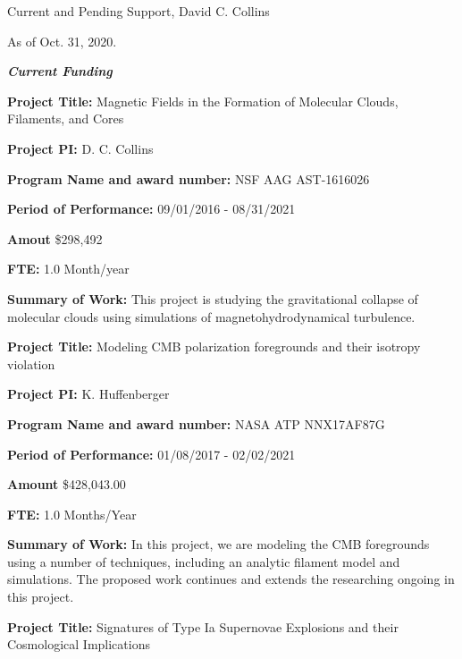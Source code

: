 \documentclass[10pt]{article}
\begin{document}
\newcommand{\LT}[1]{\noindent\textbf{#1}}
\begin{LARGE}
\noindent Current and Pending Support, David C. Collins
\end{LARGE}

As of Oct. 31, 2020.



\vspace{0.1in}

\noindent \large{\textbf{\emph{Current Funding}}}

\vspace{0.1in}

\LT{Project Title:} Magnetic Fields in the Formation of Molecular Clouds,
Filaments, and Cores

\LT{Project PI:} D. C. Collins

\LT{Program Name and award number:} NSF AAG  AST-1616026 

\LT{Period of Performance:} 09/01/2016 - 08/31/2021

\LT{Amout} \$298,492 

\LT{FTE:} 1.0 Month/year

\LT{Summary of Work:} This project is studying the gravitational collapse of
molecular clouds using simulations of magnetohydrodynamical turbulence.  

\vspace{0.1in}


\LT{Project Title:} Modeling CMB polarization foregrounds and their isotropy
violation

\LT{Project PI:} K. Huffenberger 

\LT{Program Name and award number:} NASA ATP  NNX17AF87G

\LT{Period of Performance:} 01/08/2017 - 02/02/2021

\LT{Amount} \$428,043.00

\LT{FTE:} 1.0 Months/Year

\LT{Summary of Work:} In this project, we are modeling the CMB foregrounds using
a number of techniques, including an analytic filament model and simulations.
The proposed work continues and extends the researching ongoing in this project.

\vspace{0.1in}

\LT{Project Title:} Signatures of Type Ia Supernovae Explosions and their
Cosmological Implications
\end{document}

